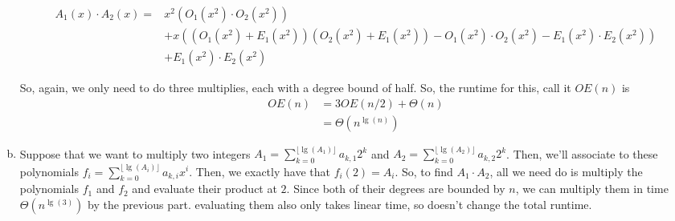\documentclass{article}
\begin{document}
\begin{enumerate}[a.]
 \begin{align*}
 A_1(x)\cdot A_2(x) =& x^2 (O_1(x^2)\cdot O_2(x^2))\\
 & + x((O_1(x^2)+ E_1(x^2))(O_2(x^2) +E_1(x^2)) - O_1(x^2)\cdot O_2(x^2) -E_1(x^2)\cdot E_2(x^2))\\
 & + E_1(x^2) \cdot E_2(x^2)
  \end{align*}

So, again, we only need to do three multiplies, each with a degree bound of half. So, the runtime for this, call it $OE(n)$ is
\begin{align*}
OE(n) &= 3OE(n/2) + \Theta(n)\\
&= \Theta(n^{\lg(n)})
\end{align*}
\item
Suppose that we want to multiply two integers $A_1 = \sum_{k=0}^{\lfloor \lg(A_1) \rfloor}a_{k,1}2^k$ and $A_2 = \sum_{k=0}^{\lfloor \lg(A_2) \rfloor}a_{k,2}2^k$. Then, we'll associate to these polynomials $f_i = \sum_{k=0}^{\lfloor\lg(A_i)\rfloor} a_{k,i}x^i$. Then, we exactly have that $f_i(2) =A_i$. So, to find $A_1\cdot A_2$, all we need do is multiply the polynomials $f_1$ and $f_2$ and evaluate their product at $2$. Since both of their degrees are bounded by $n$, we can multiply them in time $\Theta(n^{\lg(3)})$ by the previous part. evaluating them also only takes linear time, so doesn't change the total runtime.
\end{enumerate}
\end{document}
